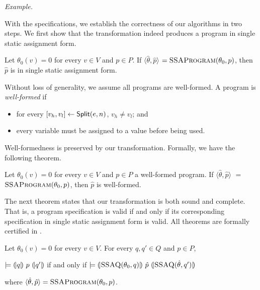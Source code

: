 \noindent
\emph{Example.}

With the \coq specifications, we establish the correctness of our
algorithms in two steps. We first show that the transformation indeed
produces a program in single static assignment form.
\begin{theorem}
  Let $\theta_0(v) = 0$ for every $v \in V$ and $p \in P$.
  If $\langle \hat{\theta}, \hat{p} \rangle$ $=
  \textsc{SSAProgram}(\theta_0, p)$, then 
  $\hat{p}$ is in single static assignment form.
\end{theorem}

Without loss of generality, we assume all programs are well-formed. 
A program is \emph{well-formed} if
\begin{itemize}
\item for every ${[}{v_h}, {v_l}{]} \leftarrow \mbox{\textsf{Split}}(e, n)$, $v_h
  \neq v_l$; and
\item every variable must be assigned to a value before being used.
\end{itemize}
Well-formedness is preserved by our transformation. Formally, we have
the following theorem.
\begin{theorem}
  Let $\theta_0(v) = 0$ for every $v \in V$ and $p \in P$ a
  well-formed program. If $\langle \hat{\theta}, \hat{p} \rangle$ $=$ 
  $\textsc{SSAProgram}(\theta_0, p)$, then $\hat{p}$ is well-formed.
\end{theorem}

The next theorem states that our transformation is both sound and
complete. That is, a program specification is valid if and only if its
corresponding specification in single static assignment form is valid.
All theorems are formally certified in \coq. 
\begin{theorem}
  Let $\theta_0(v) = 0$ for every $v \in V$. For every $q, q' \in Q$
  and $p \in P$,
  \begin{center}
    $\models {(\!|}{q}{|\!)}~{p}~{(\!|}{q'}{|\!)}$ if and only if
    $\models {(\!|}{\textsc{SSAQ}(\theta_0, q)}{|\!)}~{\hat{p}}~{(\!|}{\textsc{SSAQ}(\hat{\theta}, q')}{|\!)}$
  \end{center}
  where $\langle \hat{\theta}, \hat{p} \rangle =
  \textsc{SSAProgram}(\theta_0, p)$.
  \label{theorem:ssa}
\end{theorem}

